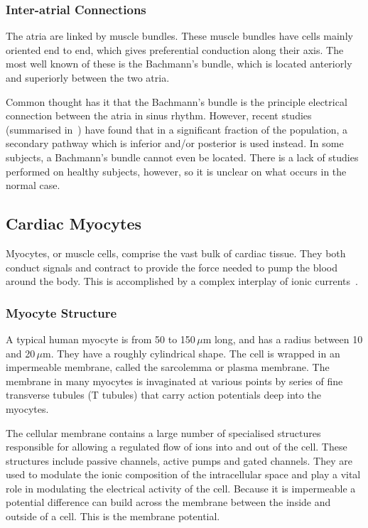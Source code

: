 \subsubsection{Inter-atrial Connections}

The atria are linked by muscle bundles.
These muscle bundles have cells mainly oriented end to end, which gives
preferential conduction along their axis.
The most well known of these is the Bachmann's bundle, which is located
anteriorly and superiorly between the two atria.

Common thought has it that the Bachmann's bundle is the principle electrical
connection between the atria in sinus rhythm.
However, recent studies (summarised in~\cite{Platonov2007,Platonov2008a}) have
found that in a significant fraction of the population, a secondary pathway
which is inferior and/or posterior is used instead.
In some subjects, a Bachmann's bundle cannot even be located.
There is a lack of studies performed on healthy subjects, however, so it is
unclear on what occurs in the normal case.

\subsection{Cardiac Myocytes}

Myocytes, or muscle cells, comprise the vast bulk of cardiac tissue.
They both conduct signals and contract to provide the force needed to pump the
blood around the body.
This is accomplished by a complex interplay of ionic
currents~\cite{Katz2006}.

\subsubsection{Myocyte Structure}

A typical human myocyte is from 50 to 150$\,\mu$m long, and has a radius
between 10 and 20$\,\mu$m.
They have a roughly cylindrical shape.
The cell is wrapped in an impermeable membrane, called the sarcolemma or plasma
membrane.
The membrane in many myocytes is invaginated at various points by series of
fine transverse tubules (T tubules) that carry action potentials deep into the
myocytes.

The cellular membrane contains a large number of specialised structures
responsible for allowing a regulated flow of ions into and out of the cell.
These structures include passive channels, active pumps and gated channels.
They are used to modulate the ionic composition of the intracellular
space and play a vital role in modulating the electrical activity of the cell.
Because it is impermeable a potential difference can build across the membrane
between the inside and outside of a cell.
This is the membrane potential.

